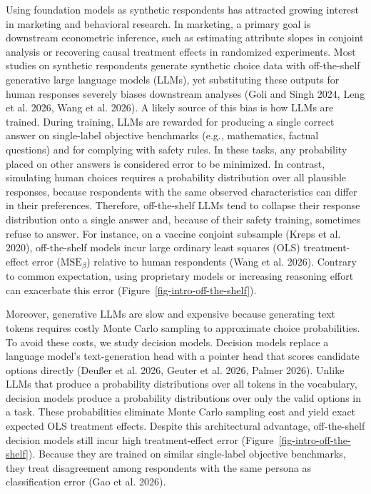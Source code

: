 \documentclass[
  11pt,
  letterpaper,
]{article}
\begin{document}
Using foundation models as synthetic respondents has attracted growing
interest in marketing and behavioral research. In marketing, a primary
goal is downstream econometric inference, such as estimating attribute
slopes in conjoint analysis or recovering causal treatment effects in
randomized experiments. Most studies on synthetic respondents generate
synthetic choice data with off-the-shelf generative large language
models (LLMs), yet substituting these outputs for human responses
severely biases downstream analyses (Goli and Singh 2024, Leng et al.
2026, Wang et al. 2026). A likely source of this bias is how LLMs are
trained. During training, LLMs are rewarded for producing a single
correct answer on single-label objective benchmarks (e.g., mathematics,
factual questions) and for complying with safety rules. In these tasks,
any probability placed on other answers is considered error to be
minimized. In contrast, simulating human choices requires a probability
distribution over all plausible responses, because respondents with the
same observed characteristics can differ in their preferences.
Therefore, off-the-shelf LLMs tend to collapse their response
distribution onto a single answer and, because of their safety training,
sometimes refuse to answer. For instance, on a vaccine conjoint
subsample (Kreps et al. 2020), off-the-shelf models incur large ordinary
least squares (OLS) treatment-effect error (\(\mathrm{MSE}_\beta\))
relative to human respondents (Wang et al. 2026). Contrary to common
expectation, using proprietary models or increasing reasoning effort can
exacerbate this error (Figure~\ref{fig-intro-off-the-shelf}).

Moreover, generative LLMs are slow and expensive because generating text
tokens requires costly Monte Carlo sampling to approximate choice
probabilities. To avoid these costs, we study decision models. Decision
models replace a language model's text-generation head with a pointer
head that scores candidate options directly (Deußer et al. 2026, Geuter
et al. 2026, Palmer 2026). Unlike LLMs that produce a probability
distributions over all tokens in the vocabulary, decision models produce
a probability distributions over only the valid options in a task. These
probabilities eliminate Monte Carlo sampling cost and yield exact
expected OLS treatment effects. Despite this architectural advantage,
off-the-shelf decision models still incur high treatment-effect error
(Figure~\ref{fig-intro-off-the-shelf}). Because they are trained on
similar single-label objective benchmarks, they treat disagreement among
respondents with the same persona as classification error (Gao et al.
2026).
\end{document}
